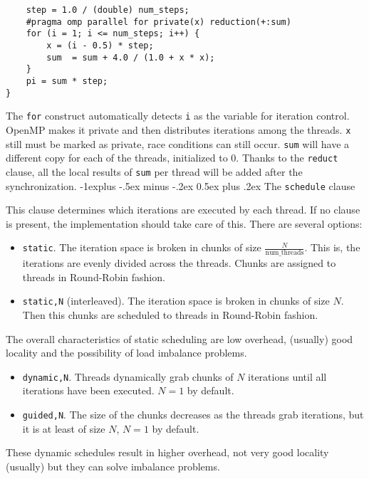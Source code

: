 \documentclass[10pt,landscape]{article}
\makeatletter
\renewcommand{\subsection}{\@startsection{subsection}{2}{0mm}%
                                {-1explus -.5ex minus -.2ex}%
                                {0.5ex plus .2ex}%
                                {\normalfont\normalsize\bfseries}}
\makeatother
\begin{document}
\begin{multicols}{3}
\begin{verbatim}
    step = 1.0 / (double) num_steps;
    #pragma omp parallel for private(x) reduction(+:sum)
    for (i = 1; i <= num_steps; i++) {
        x = (i - 0.5) * step;
        sum  = sum + 4.0 / (1.0 + x * x);
    }
    pi = sum * step;
}
\end{verbatim}
\par
The \texttt{for} construct automatically detects \texttt{i} as the variable for iteration control. OpenMP makes it private and then distributes iterations among the threads. \texttt{x} still must be marked as private, race conditions can still occur. \texttt{sum} will have a different copy for each of the threads, initialized to 0. Thanks to the \texttt{reduct} clause, all the local results of \texttt{sum} per thread will be added after the synchronization.
\subsection{The \texttt{schedule} clause}
\par
This clause determines which iterations are executed by each thread. If no clause is present, the implementation should take care of this. There are several options:
\begin{itemize}
    \item \texttt{static}. The iteration space is broken in chunks of size $\frac{N}{\text{num\_threads}}$. This is, the iterations are evenly divided across the threads. Chunks are assigned to threads in Round-Robin fashion.
    \item \texttt{static,N} (interleaved). The iteration space is broken in chunks of size $N$. Then this chunks are scheduled to threads in Round-Robin fashion.
\end{itemize}
\par
The overall characteristics of static scheduling are low overhead, (usually) good locality and the possibility of load imbalance problems.
\begin{itemize}
    \item \texttt{dynamic,N}. Threads dynamically grab chunks of $N$ iterations until all iterations have been executed. $N=1$ by default.
    \item \texttt{guided,N}. The size of the chunks decreases as the threads grab iterations, but it is at least of size $N$, $N=1$ by default.
\end{itemize}
\par
These dynamic schedules result in higher overhead, not very good locality (usually) but they can solve imbalance problems.

\end{multicols}
\end{document}
